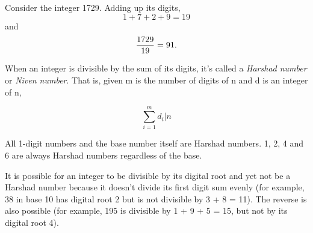 \documentclass[12pt]{article}
\begin{document}
Consider the integer 1729. Adding up its digits, $$1 + 7 + 2 + 9 = 19$$ and $${{1729} \over {19}} = 91.$$

When an integer is divisible by the sum of its digits, it's called a {\em Harshad number} or {\em Niven number}. That is, given m is the number of digits of n and d is an integer of n,

$${\sum_{i = 1}^m d_i}|n$$

All 1-digit numbers and the base number itself are Harshad numbers. 1, 2, 4 and 6 are always Harshad numbers regardless of the base.

It is possible for an integer to be divisible by its digital root and yet not be a Harshad number because it doesn't divide its first digit sum evenly (for example, 38 in base 10 has digital root 2 but is not divisible by 3 + 8 = 11). The reverse is also possible (for example, 195 is divisible by 1 + 9 + 5 = 15, but not by its digital root 4).
\end{document}
